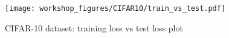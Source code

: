 \documentclass{article}
\theoremstyle{definition}
\theoremstyle{remark}
\renewcommand{\[}{\begin{eqnarray}}
\renewcommand{\]}{\end{eqnarray}}
\renewcommand{\[}{\begin{eqnarray}}
\renewcommand{\]}{\end{eqnarray}}
\newcommand{\F}{\mathcal{F}}
\begin{document}
\begin{figure}[!t]
\centering
\texttt{[image: workshop\_figures/CIFAR10/train\_vs\_test.pdf]}\\
  \caption{{CIFAR-10 dataset: training loss vs test loss plot}}%
  \label{fig:cifar10_lr1k_tvt}
\end{figure}





\end{document}
